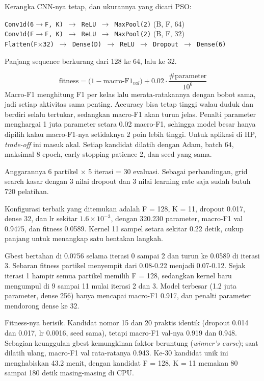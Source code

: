 Kerangka CNN-nya tetap, dan ukurannya yang dicari PSO:
\begin{center}\small
\texttt{Conv1d(6$\to$F, K) $\to$ ReLU $\to$ MaxPool(2)} \quad (B, F, 64)\\
\texttt{Conv1d(F$\to$F, K) $\to$ ReLU $\to$ MaxPool(2)} \quad (B, F, 32)\\
\texttt{Flatten(F$\times$32) $\to$ Dense(D) $\to$ ReLU $\to$ Dropout $\to$ Dense(6)}
\end{center}
Panjang sequence berkurang dari 128 ke 64, lalu ke 32.

\[ \text{fitness} = \big(1 - \text{macro-F1}_{val}\big) + 0.02 \cdot \frac{\#\text{parameter}}{10^6} \]
Macro-F1 menghitung F1 per kelas lalu merata-ratakannya dengan bobot sama, jadi setiap aktivitas sama penting. Accuracy bisa tetap tinggi walau duduk dan berdiri selalu tertukar, sedangkan macro-F1 akan turun jelas. Penalti parameter menghargai 1 juta parameter setara 0.02 macro-F1, sehingga model besar hanya dipilih kalau macro-F1-nya setidaknya 2 poin lebih tinggi. Untuk aplikasi di HP, \emph{trade-off} ini masuk akal. Setiap kandidat dilatih dengan Adam, batch 64, maksimal 8 epoch, early stopping patience 2, dan seed yang sama.

Anggarannya 6 partikel $\times$ 5 iterasi = 30 evaluasi. Sebagai perbandingan, grid search kasar dengan 3 nilai dropout dan 3 nilai learning rate saja sudah butuh 720 pelatihan.


Konfigurasi terbaik yang ditemukan adalah F = 128, K = 11, dropout 0.017, dense 32, dan lr sekitar $1.6\times10^{-3}$, dengan 320.230 parameter, macro-F1 val 0.9475, dan fitness 0.0589. Kernel 11 sampel setara sekitar 0.22 detik, cukup panjang untuk menangkap satu hentakan langkah.

Gbest bertahan di 0.0756 selama iterasi 0 sampai 2 dan turun ke 0.0589 di iterasi 3. Sebaran fitness partikel menyempit dari 0.08-0.22 menjadi 0.07-0.12. Sejak iterasi 1 hampir semua partikel memilih F = 128, sedangkan kernel baru mengumpul di 9 sampai 11 mulai iterasi 2 dan 3. Model terbesar (1.2 juta parameter, dense 256) hanya mencapai macro-F1 0.917, dan penalti parameter mendorong dense ke 32.

Fitness-nya berisik. Kandidat nomor 15 dan 20 praktis identik (dropout 0.014 dan 0.017, lr 0.0016, seed sama), tetapi macro-F1 val-nya 0.919 dan 0.948. Sebagian keunggulan gbest kemungkinan faktor beruntung (\emph{winner's curse}); saat dilatih ulang, macro-F1 val rata-ratanya 0.943. Ke-30 kandidat unik ini menghabiskan 43.2 menit, dengan kandidat F = 128, K = 11 memakan 80 sampai 180 detik masing-masing di CPU.

